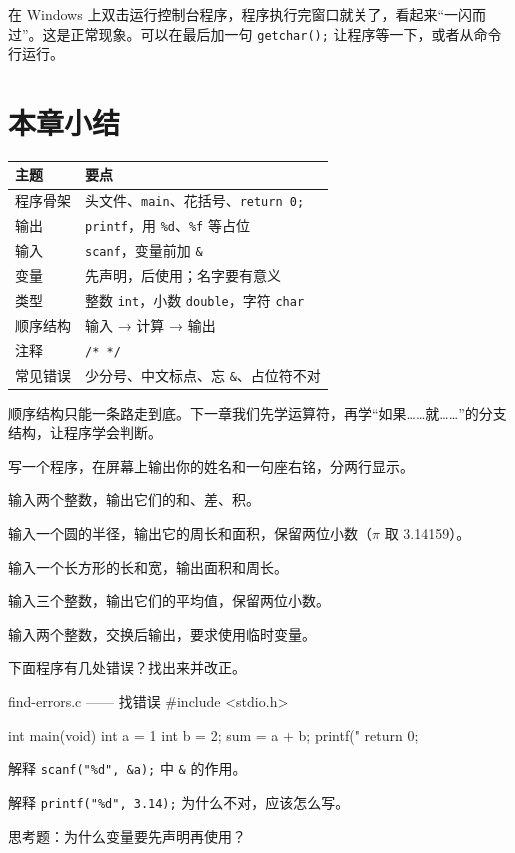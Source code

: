 \begin{pitfall}[程序一闪而过]
在 Windows 上双击运行控制台程序，程序执行完窗口就关了，看起来“一闪而过”。这是正常现象。可以在最后加一句 \texttt{getchar();} 让程序等一下，或者从命令行运行。
\end{pitfall}

\section{本章小结}

\begin{center}
\begin{tabular}{@{}p{}p{}@{}}
\toprule
主题 & 要点 \\
\midrule
程序骨架 & 头文件、\texttt{main}、花括号、\texttt{return 0;} \\
输出 & \texttt{printf}，用 \texttt{\%d}、\texttt{\%f} 等占位 \\
输入 & \texttt{scanf}，变量前加 \texttt{\&} \\
变量 & 先声明，后使用；名字要有意义 \\
类型 & 整数 \texttt{int}，小数 \texttt{double}，字符 \texttt{char} \\
顺序结构 & 输入 → 计算 → 输出 \\
注释 & \texttt{/* */} \\
常见错误 & 少分号、中文标点、忘 \texttt{\&}、占位符不对 \\
\bottomrule
\end{tabular}
\end{center}

\begin{tipbox}[下一章预告]
顺序结构只能一条路走到底。下一章我们先学运算符，再学“如果……就……”的分支结构，让程序学会判断。
\end{tipbox}

\begin{problemset}
  \item 写一个程序，在屏幕上输出你的姓名和一句座右铭，分两行显示。
  \item 输入两个整数，输出它们的和、差、积。
  \item 输入一个圆的半径，输出它的周长和面积，保留两位小数（$\pi$ 取 3.14159）。
  \item 输入一个长方形的长和宽，输出面积和周长。
  \item 输入三个整数，输出它们的平均值，保留两位小数。
  \item 输入两个整数，交换后输出，要求使用临时变量。
  \item 下面程序有几处错误？找出来并改正。
\begin{codebox}{find-errors.c —— 找错误}
#include <stdio.h>

int main(void)
{
    int a = 1
    int b = 2;
    sum = a + b;
    printf("%
    return 0;
}
\end{codebox}
  \item 解释 \texttt{scanf("\%d", \&a);} 中 \texttt{\&} 的作用。
  \item 解释 \texttt{printf("\%d", 3.14);} 为什么不对，应该怎么写。
  \item 思考题：为什么变量要先声明再使用？
\end{problemset}
